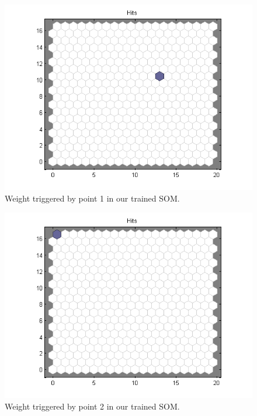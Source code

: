 \documentclass[a4paper]{article}
\begin{document}
 \begin{figure}[H] %
	 \includegraphics[]{point1.png}
	 \caption{\label{fig:point1} Weight triggered by point 1 in our trained SOM.}
 \end{figure}
 \begin{figure}[H] %
	 \includegraphics[]{point2.png}
	 \caption{\label{fig:point2} Weight triggered by point 2 in our trained SOM.}
 \end{figure}
\end{document}
